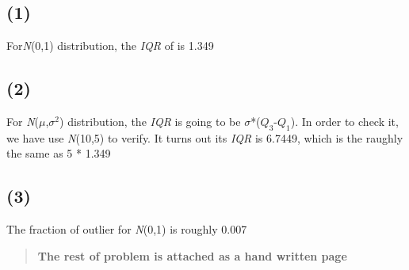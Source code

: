 \documentclass{article}\usepackage[]{graphicx}\usepackage[]{color}
\begin{document}
\subsection*{(1)}
For\emph{N}(0,1) distribution, the \emph{IQR} of is 1.349 \\
\subsection*{(2)}
For \emph{N}($\mu$,$\sigma^2$) distribution, the \emph{IQR} is going to be $\sigma$*($Q_{3}$-$Q_{1}$). In order to check it, we have use \emph{N}(10,5) to verify. It turns out its \emph{IQR} is 6.7449, which is the raughly the same as 5 *  1.349\\
\subsection*{(3)}
The fraction of outlier for \emph{N}(0,1) is roughly 0.007
\begin{quote}
\textbf{The rest of problem is attached as a hand written page}
\end{quote}
\end{document}
